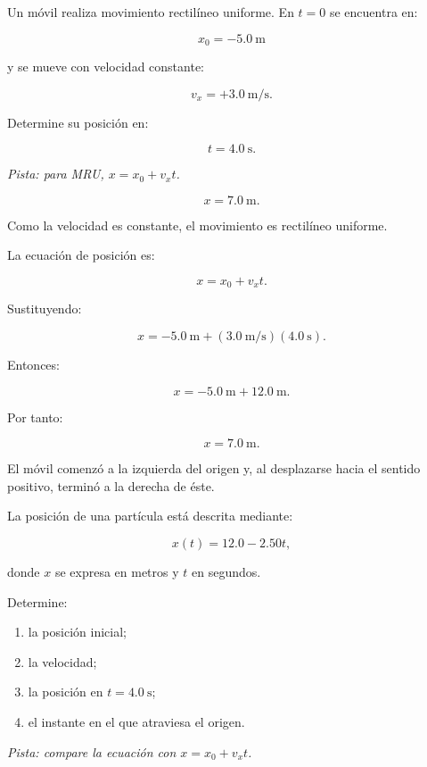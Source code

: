 \begin{ejercicio}
Un móvil realiza movimiento rectilíneo uniforme. En \(t=0\) se encuentra en:

\[ x_0=-\SI{5.0}{\meter} \]

y se mueve con velocidad constante:

\[ v_x=+\SI{3.0}{\meter\per\second}. \]

Determine su posición en:

\[ t=\SI{4.0}{\second}. \]

\textit{Pista: para MRU, \(x=x_0+v_xt\).}
\end{ejercicio}

\begin{respuesta}
\[ \boxed{x=\SI{7.0}{\meter}}. \]
\end{respuesta}

\begin{explicacion}
Como la velocidad es constante, el movimiento es rectilíneo uniforme.

La ecuación de posición es:

\[ x=x_0+v_xt. \]

Sustituyendo:

\[
x
=
-\SI{5.0}{\meter}
+
(\SI{3.0}{\meter\per\second})
(\SI{4.0}{\second}).
\]

Entonces:

\[
x
=
-\SI{5.0}{\meter}
+
\SI{12.0}{\meter}.
\]

Por tanto:

\[ \boxed{x=\SI{7.0}{\meter}}. \]

El móvil comenzó a la izquierda del origen y, al desplazarse hacia el sentido positivo, terminó a la derecha de éste.
\end{explicacion}


\begin{ejercicio}
La posición de una partícula está descrita mediante:

\[ x(t)=12.0-2.50t, \]

donde \(x\) se expresa en metros y \(t\) en segundos.

Determine:

\begin{enumerate}[label=\alph*)]
    \item la posición inicial;
    \item la velocidad;
    \item la posición en \(t=\SI{4.0}{\second}\);
    \item el instante en el que atraviesa el origen.
\end{enumerate}

\textit{Pista: compare la ecuación con \(x=x_0+v_xt\).}
\end{ejercicio}

